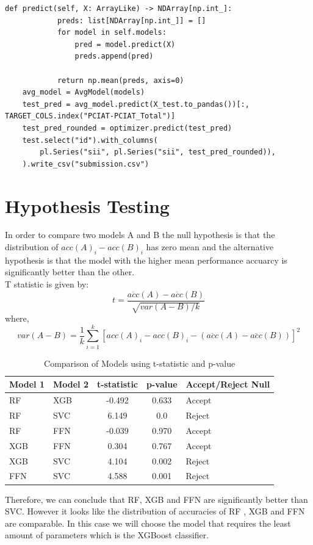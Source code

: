 \begin{appendices}
\begin{mdframed}
\begin{lstlisting}[breaklines=true]
        def predict(self, X: ArrayLike) -> NDArray[np.int_]:
            preds: list[NDArray[np.int_]] = []
            for model in self.models:
                pred = model.predict(X)
                preds.append(pred)

            return np.mean(preds, axis=0)
    avg_model = AvgModel(models)
    test_pred = avg_model.predict(X_test.to_pandas())[:, TARGET_COLS.index("PCIAT-PCIAT_Total")]
    test_pred_rounded = optimizer.predict(test_pred)
    test.select("id").with_columns(
        pl.Series("sii", pl.Series("sii", test_pred_rounded)),
    ).write_csv("submission.csv")
    \end{lstlisting}
    \end{mdframed}


    \pagebreak
    \section{Hypothesis Testing}
    In order to compare two models A and B the null hypothesis is that the distribution of $acc(A)_i - acc(B)_i$ has zero mean and the alternative hypothesis is that the model with the higher mean performance accuarcy is significantly better than the other.\\
    T statistic is given by:
        \[
        t = \frac{\overline{acc}(A) - \overline{acc}(B)}{\sqrt{var(A - B)/k}}
        \]
        where,
        \[
        var(A - B) = \frac{1}{k}\sum_{i=1}^k [acc(A)_i - acc(B)_i - (\overline{acc}(A) - \overline{acc}(B))]^2
        \]

        \begin{table}[h!]
            \centering
            \caption{Comparison of Models using t-statistic and p-value}
            \begin{tabular}{|l|l|c|c|l|}
                \hline
                \textbf{Model 1} & \textbf{Model 2} & \textbf{t-statistic} & \textbf{p-value} & \textbf{Accept/Reject Null} \\
                \hline
                RF & XGB & -0.492 & 0.633 & Accept \\
                \hline
                RF & SVC & 6.149 & 0.0 & Reject \\
                \hline
                RF & FFN & -0.039 & 0.970 & Accept \\
                \hline
                XGB & FFN & 0.304 & 0.767 & Accept \\
                \hline
                XGB & SVC & 4.104 & 0.002 & Reject \\
                \hline
                FFN & SVC & 4.588 & 0.001 & Reject \\
                \hline
            \end{tabular}
        \end{table}
    Therefore, we can conclude that RF, XGB and FFN are significantly better than SVC. 
    However it looks like the distribution of accuracies of RF , XGB and FFN are comparable. 
    In this case we will choose the model that requires the least amount of parameters which is the XGBoost classifier.

  
\end{appendices}
